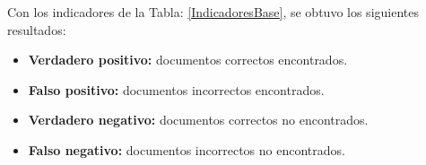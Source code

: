 Con los indicadores de la Tabla: \ref{IndicadoresBase}, se obtuvo los siguientes resultados:
\begin{itemize}
\item \textbf{Verdadero positivo: }documentos correctos encontrados.
\item \textbf{Falso positivo: } documentos incorrectos encontrados.
\item \textbf{Verdadero negativo: } documentos correctos no encontrados.
\item \textbf{Falso negativo: } documentos incorrectos no encontrados.
\end{itemize}


